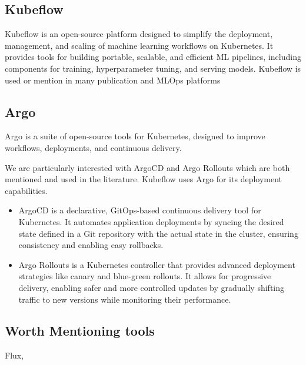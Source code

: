 \subsection{Kubeflow}
Kubeflow\cite{Kubeflow} is an open-source platform designed to simplify the deployment, management, and scaling of machine learning workflows on Kubernetes.
It provides tools for building portable, scalable, and efficient ML pipelines, including components for training, hyperparameter tuning, and serving models.
Kubeflow is used or mention in many publication and MLOps platforms\cite{inproceedings,10855428}

\subsection{Argo}
Argo\cite{argo} is a suite of open-source tools for Kubernetes, designed to improve workflows, deployments, and continuous delivery.

We are particularly interested with ArgoCD and Argo Rollouts which are both mentioned and used in the literature.
Kubeflow uses Argo for its deployment capabilities.

\begin{itemize}
    \item ArgoCD
     is a declarative, GitOps-based continuous delivery tool for Kubernetes.
     It automates application deployments by syncing the desired state
    defined in a Git repository with the actual state in the cluster,
    ensuring consistency and enabling easy rollbacks.

    \item Argo Rollouts
     is a Kubernetes controller that provides advanced deployment strategies
     like canary and blue-green rollouts. It allows for progressive
    delivery, enabling safer and more controlled updates by gradually
    shifting traffic to new versions while monitoring their performance.
\end{itemize}


\subsection{Worth Mentioning tools}
Flux,